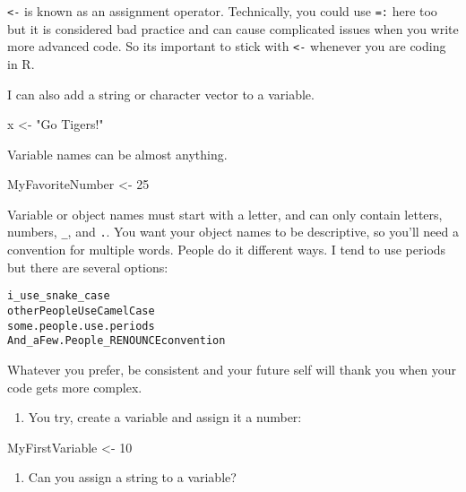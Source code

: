 \documentclass[
]{article}
\newenvironment{Shaded}{\begin{snugshade}}{\end{snugshade}}
\newcommand{\DecValTok}[1]{\textcolor[rgb]{0.00,0.00,0.81}{#1}}
\newcommand{\NormalTok}[1]{#1}
\newcommand{\OtherTok}[1]{\textcolor[rgb]{0.56,0.35,0.01}{#1}}
\newcommand{\StringTok}[1]{\textcolor[rgb]{0.31,0.60,0.02}{#1}}
\providecommand{\tightlist}{%
  \setlength{\itemsep}{0pt}\setlength{\parskip}{0pt}}
\begin{document}
\texttt{\textless{}-} is known as an assignment operator. Technically,
you could use \texttt{=:} here too but it is considered bad practice and
can cause complicated issues when you write more advanced code. So its
important to stick with \texttt{\textless{}-} whenever you are coding in
R.

I can also add a string or character vector to a variable.

\begin{Shaded}
\begin{Highlighting}[]
\NormalTok{x }\OtherTok{\textless{}{-}} \StringTok{"Go Tigers!"}
\end{Highlighting}
\end{Shaded}

Variable names can be almost anything.

\begin{Shaded}
\begin{Highlighting}[]
\NormalTok{MyFavoriteNumber }\OtherTok{\textless{}{-}} \DecValTok{25}
\end{Highlighting}
\end{Shaded}

Variable or object names must start with a letter, and can only contain
letters, numbers, \texttt{\_}, and \texttt{.}. You want your object
names to be descriptive, so you'll need a convention for multiple words.
People do it different ways. I tend to use periods but there are several
options:

\begin{verbatim}
i_use_snake_case 
otherPeopleUseCamelCase 
some.people.use.periods 
And_aFew.People_RENOUNCEconvention
\end{verbatim}

Whatever you prefer, be consistent and your future self will thank you
when your code gets more complex.

\begin{enumerate}
\def\labelenumi{(\arabic{enumi})}
\setcounter{enumi}{7}
\tightlist
\item
  You try, create a variable and assign it a number:
\end{enumerate}

\begin{Shaded}
\begin{Highlighting}[]
\NormalTok{MyFirstVariable }\OtherTok{\textless{}{-}} \DecValTok{10}
\end{Highlighting}
\end{Shaded}

\begin{enumerate}
\def\labelenumi{(\arabic{enumi})}
\setcounter{enumi}{8}
\tightlist
\item
  Can you assign a string to a variable?
\end{enumerate}
\end{document}
